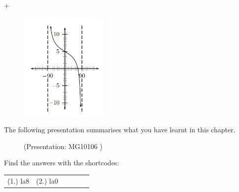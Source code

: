 \begin{enumerate}[noitemsep, label=\textbf{\arabic*}. ]
\begin{figure}[H]
\begin{center}
\vspace{2pt}
\vspace{.1in}
\end{center}
\end{figure}       +
\setcounter{subfigure}{0}
\begin{figure}[H] %
\begin{center}
\label{m39414*id92174!!!underscore!!!media}\label{m39414*id92174!!!underscore!!!printimage}\includegraphics[height=200px]{col11306.imgs/m39414_trigrep6.png} %
\vspace{2pt}
\vspace{.1in}
\end{center}
\end{figure}               \end{enumerate}
\label{m39414*eip-749}The following presentation summarises what you have learnt in this chapter.
\setcounter{subfigure}{0}
\begin{figure}[H] %
\label{m39414*slidesharemedia}\label{m39414*slideshareflash} { (Presentation:  MG10106 )}
\vspace{2pt}
\vspace{.1in}
\end{figure}       \par 

\par {} Find the answers with the shortcodes:
\par \begin{tabular}[h]{cccccc}
(1.) la8  &  (2.) la0  & \end{tabular}
